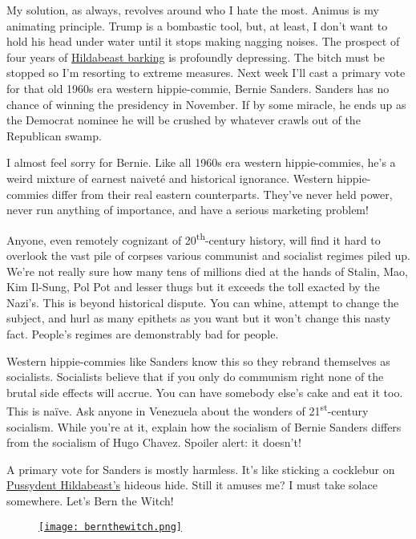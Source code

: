 My solution, as always, revolves around who I hate the most. Animus is
my animating principle. Trump is a bombastic tool, but, at least, I
don't want to hold his head under water until it stops making nagging
noises. The prospect of four years of
\href{http://hotair.com/archives/2016/02/16/video-for-some-reason-hillary-barks-like-a-dog-during-stump-speech/}{Hildabeast
barking} is profoundly depressing. The bitch must be stopped so I'm
resorting to extreme measures. Next week I'll cast a primary vote for
that old 1960s era western hippie-commie, Bernie Sanders. Sanders has no
chance of winning the presidency in November. If by some miracle, he
ends up as the Democrat nominee he will be crushed by whatever crawls
out of the Republican swamp.

I almost feel sorry for Bernie. Like all 1960s era western
hippie-commies, he's a weird mixture of earnest naiveté and historical
ignorance. Western hippie-commies differ from their real eastern
counterparts. They've never held power, never run anything of
importance, and have a serious marketing problem!

Anyone, even remotely cognizant of 20\textsuperscript{th}-century
history, will find it hard to overlook the vast pile of corpses various
communist and socialist regimes piled up. We're not really sure how many
tens of millions died at the hands of Stalin, Mao, Kim Il-Sung, Pol Pot
and lesser thugs but it exceeds the toll exacted by the Nazi's. This is
beyond historical dispute. You can whine, attempt to change the subject,
and hurl as many epithets as you want but it won't change this nasty
fact. People's regimes are demonstrably bad for people.

Western hippie-commies like Sanders know this so they rebrand themselves
as socialists. Socialists believe that if you only do communism right
none of the brutal side effects will accrue. You can have somebody
else's cake and eat it too. This is naïve. Ask anyone in Venezuela about
the wonders of 21\textsuperscript{st}-century socialism. While you're at
it, explain how the socialism of Bernie Sanders differs from the
socialism of Hugo Chavez. Spoiler alert: it doesn't!

A primary vote for Sanders is mostly harmless. It's like sticking a
cocklebur on
\href{https://bakerjd99.wordpress.com/2014/04/15/pussydent-hildabeast/}{Pussydent
Hildabeast's} hideous hide. Still it amuses me? I must take solace
somewhere. Let's Bern the Witch!

\captionsetup[figure]{labelformat=empty}
\begin{figure}[htbp]
\centering
\href{http://www.zazzle.com/bern_the_witch_car_bumper_sticker-128802686687335170}{\texttt{[image: bernthewitch.png]}}
\label{fig:5197X0}
\end{figure}


%